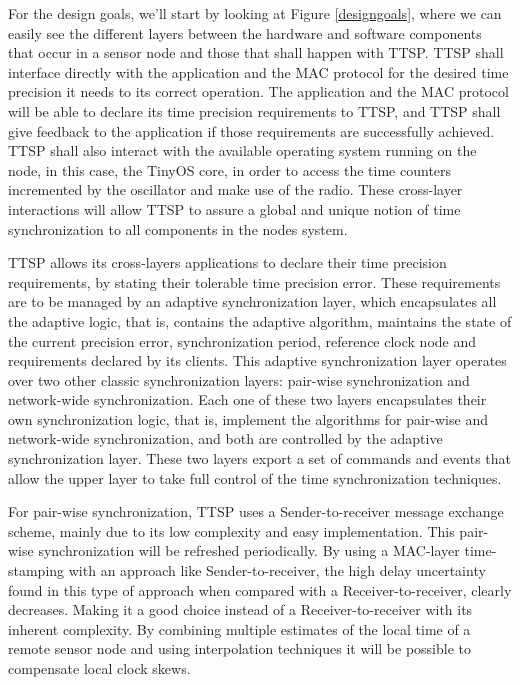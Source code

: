 \documentclass[11pt,a4]{article}
\begin{document}
\begin{multicols}{2}
For the design goals, we'll start by looking at Figure \ref{designgoals}, where we can easily see the different layers between the hardware and software components that occur in a sensor node and those that shall happen with TTSP. TTSP shall interface directly with the application and the MAC protocol for the desired time precision it needs to its correct operation. The application and the MAC protocol will be able to declare its time precision requirements to TTSP, and TTSP shall give feedback to the application if those requirements are successfully achieved. TTSP shall also interact with the available operating system running on the node, in this case, the TinyOS core, in order to access the time counters incremented by the oscillator and make use of the radio. These cross-layer interactions will allow TTSP to assure a global and unique notion of time synchronization to all components in the nodes system.

TTSP allows its cross-layers applications to declare their time precision requirements, by stating their tolerable time precision error. These requirements are to be managed by an adaptive synchronization layer, which encapsulates all the adaptive logic, that is, contains the adaptive algorithm, maintains the state of the current precision error, synchronization period, reference clock node and requirements declared by its clients. This adaptive synchronization layer operates over two other classic synchronization layers: pair-wise synchronization and network-wide synchronization. Each one of these two layers encapsulates their own synchronization logic, that is, implement the algorithms for pair-wise and network-wide synchronization, and both are controlled by the adaptive synchronization layer. These two layers export a set of commands and events that allow the upper layer to take full control of the time synchronization techniques.

For pair-wise synchronization, TTSP uses a Sender-to-receiver message exchange scheme, mainly due to its low complexity and easy implementation. This pair-wise synchronization will be refreshed periodically. By using a MAC-layer time-stamping with an approach like Sender-to-receiver, the high delay uncertainty found in this type of approach when compared with a Receiver-to-receiver, clearly decreases. Making it a good choice instead of a Receiver-to-receiver with its inherent complexity.  By combining multiple estimates of the local time of a remote sensor node and using interpolation techniques it will be possible to compensate local clock skews.


\end{multicols}
\end{document}
